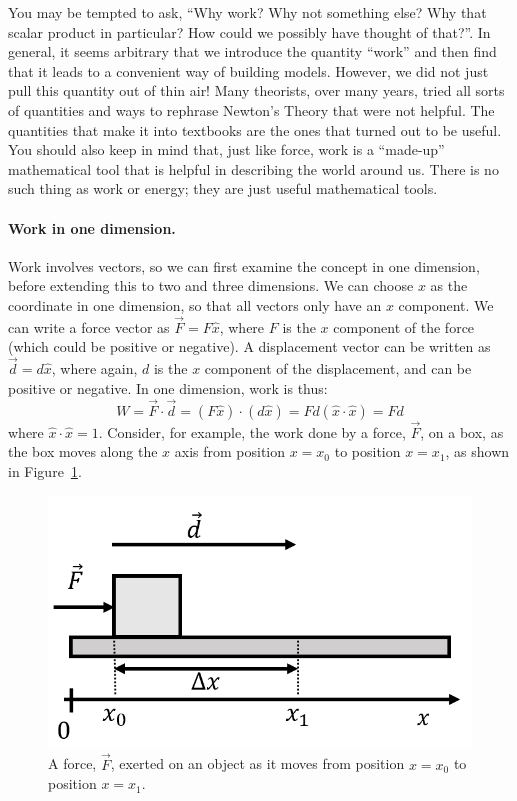 You may be tempted to ask, ``Why work? Why not something else? Why that scalar product in particular? How could we possibly have thought of that?''. In general, it seems arbitrary that we introduce the quantity ``work'' and then find that it leads to a convenient way of building models. However, we did not just pull this quantity out of thin air! Many theorists, over many years, tried all sorts of quantities and ways to rephrase Newton's Theory that were not helpful. The quantities that make it into textbooks are the ones that turned out to be useful. You should also keep in mind that, just like force, work is a ``made-up'' mathematical tool that is helpful in describing the world around us. There is no such thing as work or energy; they are just useful mathematical tools.

\paragraph{Work in one dimension.}

Work involves vectors, so we can first examine the concept in one dimension, before extending this to two and three dimensions. We can choose $x$ as the coordinate in one dimension, so that all vectors only have an $x$ component. We can write a force vector as $\vec F=F\hat x$, where $F$ is the $x$ component of the force (which could be positive or negative). A displacement vector can be written as $\vec d = d \hat x$, where again, $d$ is the $x$ component of the displacement, and can be positive or negative. In one dimension, work is thus:
\begin{equation}
W = \vec F \cdot \vec d = (F\hat x) \cdot ( d\hat x ) = Fd (\hat x\cdot\hat x)=Fd
\end{equation}
where $\hat x \cdot \hat x = 1$. Consider, for example, the work done by a force, $\vec F$, on a box, as the box moves along the $x$ axis from position $x=x_0$ to position $x=x_1$, as shown in Figure~\ref{fig:workenergy:work1d}.

\begin{figure}[!htbp]
\centering
\includegraphics[width=0.4\linewidth]{files/work1d-0daf97b5d5589ef1f3195ed30fc5eb42.png}
\caption[]{A force, $\vec F$, exerted on an object as it moves from position $x=x_0$ to position $x=x_1$.}
\label{fig:workenergy:work1d}
\end{figure}

